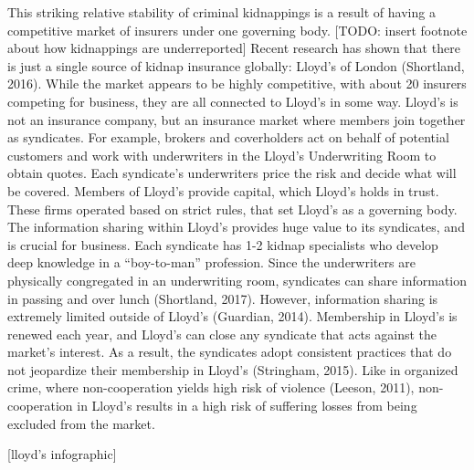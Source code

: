 \documentclass[12pt]{article}
\begin{document}
This striking relative stability of criminal kidnappings is a result of having a competitive market of insurers under one governing body. [TODO: insert footnote about how kidnappings are underreported] Recent research has shown that there is just a single source of kidnap insurance globally: Lloyd's of London (Shortland, 2016). While the market appears to be highly competitive, with about 20 insurers competing for business, they are all connected to Lloyd's in some way. Lloyd's is not an insurance company, but an insurance market where members join together as syndicates. For example, brokers and coverholders act on behalf of potential customers and work with underwriters in the Lloyd's Underwriting Room to obtain quotes. Each syndicate's underwriters price the risk and decide what will be covered. Members of Lloyd's provide capital, which Lloyd's holds in trust. These firms operated based on strict rules, that set Lloyd's as a governing body. The information sharing within Lloyd's provides huge value to its syndicates, and is crucial for business. Each syndicate has 1-2 kidnap specialists who develop deep knowledge in a ``boy-to-man'' profession. Since the underwriters are physically congregated in an underwriting room, syndicates can share information in passing and over lunch (Shortland, 2017). However, information sharing is extremely limited outside of Lloyd's (Guardian, 2014). Membership in Lloyd's is renewed each year, and Lloyd's can close any syndicate that acts against the market's interest. As a result, the syndicates adopt consistent practices that do not jeopardize their membership in Lloyd's (Stringham, 2015). Like in organized crime, where non-cooperation yields high risk of violence (Leeson, 2011), non-cooperation in Lloyd's results in a high risk of suffering losses from being excluded from the market.

[lloyd's infographic]
\end{document}
